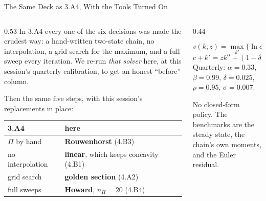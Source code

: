 \begin{frame}{The Same Deck as 3.A4, With the Tools Turned On}
\begin{columns}[T]
\begin{column}{0.53\textwidth}
\small
In 3.A4 every one of the six decisions was made the crudest way: a hand-written two-state chain, no interpolation, a grid search for the maximum, and a full sweep every iteration. We re-run \emph{that solver} here, at this session's quarterly calibration, to get an honest ``before'' column.
\medskip

Then the same five steps, with this session's replacements in place:
\medskip
\begin{center}\footnotesize
\begin{tabularx}{\linewidth}{@{}>{\raggedright\arraybackslash}p{2.3cm} >{\raggedright\arraybackslash}X@{}}
\toprule
\textbf{3.A4} & \textbf{here} \\
\midrule
$\Pi$ by hand & \textbf{Rouwenhorst} (4.B3) \\
no interpolation & \textbf{linear}, which keeps concavity (4.B1) \\
grid search & \textbf{golden section} (4.A2) \\
full sweeps & \textbf{Howard}, $n_H=20$ (4.B4) \\
\bottomrule
\end{tabularx}
\end{center}
\end{column}
\begin{column}{0.44\textwidth}
\begin{conceptbox}[title=\textbf{The model}]\small
\[
  v(k,z)=\max_{k'}\Big\{\ln c+\beta\,\mathbb{E}\big[v(k',z')\mid z\big]\Big\}
\]
\[
  c+k'=zk^{\alpha}+(1-\delta)k, \quad \ln z'=\rho\ln z+\sigma\varepsilon' .
\]
Quarterly: $\alpha=0.33$, $\beta=0.99$, $\delta=0.025$, $\rho=0.95$, $\sigma=0.007$.
\end{conceptbox}
\medskip
\begin{examplebox}\footnotesize
No closed-form policy. The benchmarks are the steady state, the chain's own moments, and the Euler residual.
\end{examplebox}
\end{column}
\end{columns}
\end{frame}

